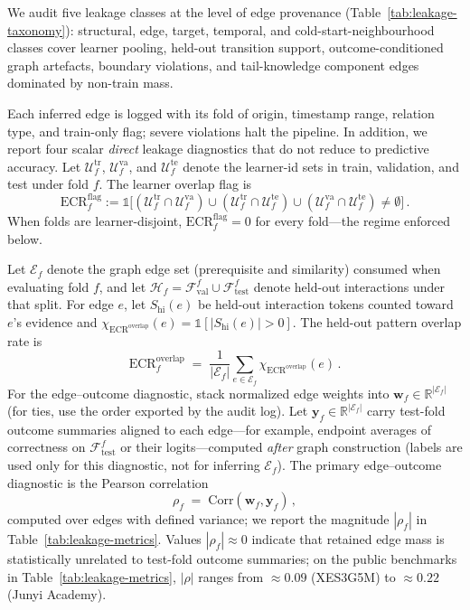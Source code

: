 \documentclass[pdflatex,sn-mathphys-num]{sn-jnl}
\newcommand{\KC}{knowledge component}
\begin{document}
We audit five leakage classes at the level of edge provenance
(Table~\ref{tab:leakage-taxonomy}): structural, edge, target, temporal, and
cold-start-neighbourhood classes cover learner pooling, held-out transition
support, outcome-conditioned graph artefacts, boundary violations, and
tail-\KC{} edges dominated by non-train mass.

Each inferred edge is logged with its fold of origin, timestamp range,
relation type, and train-only flag; severe violations halt the pipeline.
In addition, we report four scalar \emph{direct} leakage diagnostics that do
not reduce to predictive accuracy. Let $\mathcal{U}^{\mathrm{tr}}_f$,
$\mathcal{U}^{\mathrm{va}}_f$, and $\mathcal{U}^{\mathrm{te}}_f$ denote the
learner-id sets in train, validation, and test under fold $f$. The learner overlap flag is
\begin{equation}
\mathrm{ECR}^{\mathrm{flag}}_f := \mathbb{1}\big[
(\mathcal{U}^{\mathrm{tr}}_f \cap \mathcal{U}^{\mathrm{va}}_f) \cup
(\mathcal{U}^{\mathrm{tr}}_f \cap \mathcal{U}^{\mathrm{te}}_f) \cup
(\mathcal{U}^{\mathrm{va}}_f \cap \mathcal{U}^{\mathrm{te}}_f)
\neq \emptyset
\big]\,.
\label{eq:ecr-flag}
\end{equation}
When folds are learner-disjoint, $\mathrm{ECR}^{\mathrm{flag}}_f=0$ for every fold---the regime enforced below.

Let $\mathcal{E}_f$ denote the graph edge set (prerequisite and similarity) consumed when evaluating fold
$f$, and let $\mathcal{H}_f = \mathcal{F}_{\text{val}}^{f} \cup
\mathcal{F}_{\text{test}}^{f}$ denote held-out interactions under that
split. For edge $e$, let $S_{\text{hi}}(e)$ be held-out interaction tokens counted
toward $e$'s evidence and
$\chi_{\mathrm{ECR}^{\mathrm{overlap}}}(e)=\mathbb{1}[|S_{\text{hi}}(e)|>0]$.
The held-out pattern overlap rate is
\begin{equation}
\mathrm{ECR}^{\mathrm{overlap}}_f \;=\; \frac{1}{|\mathcal{E}_f|}\sum_{e\in\mathcal{E}_f}
\chi_{\mathrm{ECR}^{\mathrm{overlap}}}(e)\,.
\label{eq:ecr-overlap}
\end{equation}
For the edge--outcome diagnostic, stack normalized edge weights into
$\mathbf{w}_f\in\mathbb{R}^{|\mathcal{E}_f|}$ (for ties, use the order
exported by the audit log). Let $\mathbf{y}_f\in\mathbb{R}^{|\mathcal{E}_f|}$
carry test-fold outcome summaries aligned to each edge---for example,
endpoint averages of correctness on $\mathcal{F}_{\text{test}}^{f}$ or
their logits---computed \emph{after} graph construction (labels are used
only for this diagnostic, not for inferring $\mathcal{E}_f$).
The primary edge--outcome diagnostic is the Pearson correlation
\begin{equation}
\rho_f \;=\; \mathrm{Corr}(\mathbf{w}_f,\mathbf{y}_f)\,,
\label{eq:rho-edge-outcome}
\end{equation}
computed over edges with defined variance; we report the magnitude
$|\rho_f|$ in Table~\ref{tab:leakage-metrics}. Values
$|\rho_f|\!\approx\!0$ indicate that retained edge mass is statistically
unrelated to test-fold outcome summaries; on the public benchmarks in
Table~\ref{tab:leakage-metrics}, $|\rho|$ ranges from ${\approx}0.09$
(XES3G5M) to ${\approx}0.22$ (Junyi Academy).
\end{document}
